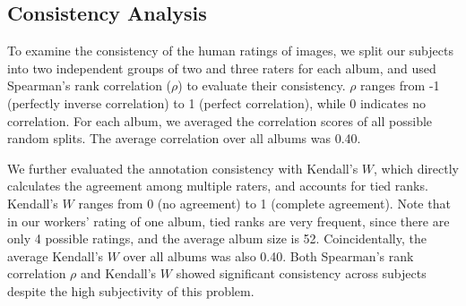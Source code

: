 \documentclass[10pt,twocolumn,letterpaper]{article}
\begin{document}


\subsection{Consistency Analysis}
\label{consistency_section}

To examine the consistency of the human ratings of images, we split our subjects into two independent groups of two and three raters for each album, and used Spearman's rank correlation ($\rho$) to evaluate their consistency. $\rho$ ranges from -1 (perfectly inverse correlation) to 1 (perfect correlation), while 0 indicates no correlation. For each album, we averaged the correlation scores of all possible random splits. The average correlation over all albums was 0.40. 

We further evaluated the annotation consistency with Kendall's $W$, which directly calculates the agreement among multiple raters, and accounts for tied ranks. Kendall's $W$ ranges from 0 (no agreement) to 1 (complete agreement). Note that in our workers' rating of one album, tied ranks are very frequent, since there are only 4 possible ratings, and the average album size is 52. Coincidentally, the average Kendall's $W$ over all albums was also 0.40. Both Spearman's rank correlation $\rho$ and Kendall's $W$ showed significant consistency across subjects despite the high subjectivity of this problem.
\end{document}
